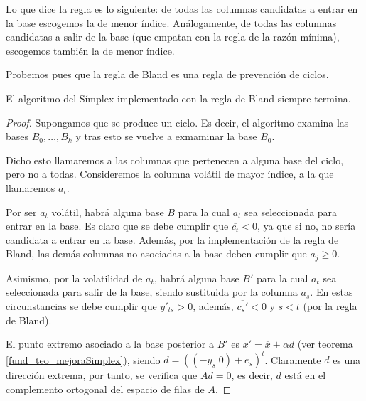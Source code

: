 Lo que dice la regla es lo siguiente: de todas las columnas candidatas a entrar en la base escogemos la de menor índice. Análogamente, de todas las columnas candidatas a salir de la base (que empatan con la regla de la razón mínima), escogemos también la de menor índice.  

Probemos pues que la regla de Bland es una regla de prevención de ciclos.
\begin{prop}
	El algoritmo del Símplex implementado con la regla de Bland siempre termina.
\end{prop}
\begin{proof}
	Supongamos que se produce un ciclo. Es decir, el algoritmo examina las bases $B_0,\dots,B_k$ y tras esto se vuelve a exmaminar la base $B_0$.
	
	Dicho esto llamaremos  a las columnas que pertenecen a alguna base del ciclo, pero no a todas. Consideremos la columna volátil de mayor índice, a la que llamaremos $a_t$.
	
	Por ser $a_t$ volátil, habrá alguna base $B$ para la cual $a_t$ sea seleccionada para entrar en la base. Es claro que se debe cumplir que $\overline{c_t}<0$, ya que si no, no sería candidata a entrar en la base. Además, por la implementación de la regla de Bland, las demás columnas no asociadas a la base deben cumplir que $\overline{a_j}\geq 0$.
	
	Asimismo, por la volatilidad de $a_t$, habrá alguna base $B'$ para la cual $a_t$ sea seleccionada para salir de la base, siendo sustituida por la columna $a_s$. En estas circunstancias se debe cumplir que $y'_{ts}>0$, además, $\overline{c_s'}<0$ y $s<t$ (por la regla de Bland).
	
	El punto extremo asociado a la base posterior a $B'$ es $x'=\overline{x}+\alpha d$ (ver teorema \ref{fund_teo_mejoraSimplex}), siendo $d=((-y_s|0)+e_s)^t$. Claramente $d$ es una dirección extrema, por tanto, se verifica que $Ad=0$, es decir, $d$ está en el complemento ortogonal del espacio de filas de $A$.
	

\end{proof}

